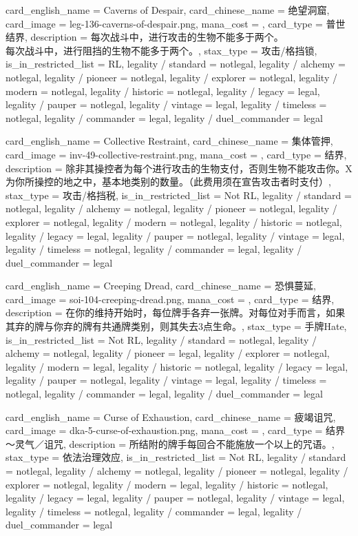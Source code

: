 \documentclass[lang = cn, color = black, 10pt]{AllThatStax}
\begin{document}
\card
{
	card_english_name = {Caverns of Despair},
	card_chinese_name = {绝望洞窟},
	card_image = leg-136-caverns-of-despair.png,
	mana_cost = ,
	card_type = 普世结界,
	description = {每次战斗中，进行攻击的生物不能多于两个。\\
每次战斗中，进行阻挡的生物不能多于两个。},
	stax_type = 攻击/格挡锁,
	is_in_restricted_list = RL,
	legality / standard = notlegal,
	legality / alchemy = notlegal,
	legality / pioneer = notlegal,
	legality / explorer = notlegal,
	legality / modern = notlegal,
	legality / historic = notlegal,
	legality / legacy = legal,
	legality / pauper = notlegal,
	legality / vintage = legal,
	legality / timeless = notlegal,
	legality / commander = legal,
	legality / duel_commander = legal
}

\card
{
	card_english_name = {Collective Restraint},
	card_chinese_name = {集体管押},
	card_image = inv-49-collective-restraint.png,
	mana_cost = ,
	card_type = 结界,
	description = {除非其操控者为每个进行攻击的生物支付，否则生物不能攻击你。X为你所操控的地之中，基本地类别的数量。（此费用须在宣告攻击者时支付）},
	stax_type = 攻击/格挡税,
	is_in_restricted_list = Not RL,
	legality / standard = notlegal,
	legality / alchemy = notlegal,
	legality / pioneer = notlegal,
	legality / explorer = notlegal,
	legality / modern = notlegal,
	legality / historic = notlegal,
	legality / legacy = legal,
	legality / pauper = notlegal,
	legality / vintage = legal,
	legality / timeless = notlegal,
	legality / commander = legal,
	legality / duel_commander = legal
}

\card
{
	card_english_name = {Creeping Dread},
	card_chinese_name = {恐惧蔓延},
	card_image = soi-104-creeping-dread.png,
	mana_cost = ,
	card_type = 结界,
	description = {在你的维持开始时，每位牌手各弃一张牌。对每位对手而言，如果其弃的牌与你弃的牌有共通牌类别，则其失去3点生命。},
	stax_type = 手牌Hate,
	is_in_restricted_list = Not RL,
	legality / standard = notlegal,
	legality / alchemy = notlegal,
	legality / pioneer = legal,
	legality / explorer = notlegal,
	legality / modern = legal,
	legality / historic = notlegal,
	legality / legacy = legal,
	legality / pauper = notlegal,
	legality / vintage = legal,
	legality / timeless = notlegal,
	legality / commander = legal,
	legality / duel_commander = legal
}

\card
{
	card_english_name = {Curse of Exhaustion},
	card_chinese_name = {疲竭诅咒},
	card_image = dka-5-curse-of-exhaustion.png,
	mana_cost = ,
	card_type = 结界～灵气／诅咒,
	description = {所结附的牌手每回合不能施放一个以上的咒语。},
	stax_type = 依法治理效应,
	is_in_restricted_list = Not RL,
	legality / standard = notlegal,
	legality / alchemy = notlegal,
	legality / pioneer = notlegal,
	legality / explorer = notlegal,
	legality / modern = legal,
	legality / historic = notlegal,
	legality / legacy = legal,
	legality / pauper = notlegal,
	legality / vintage = legal,
	legality / timeless = notlegal,
	legality / commander = legal,
	legality / duel_commander = legal
}
\end{document}
